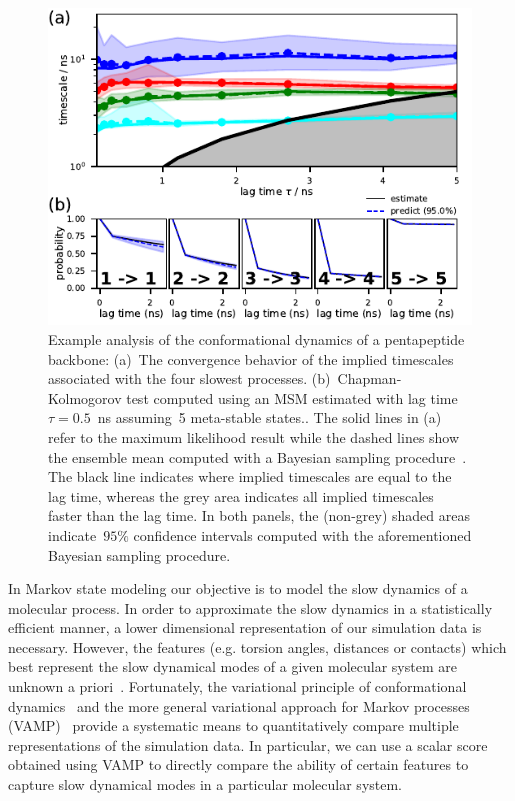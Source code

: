 \documentclass[9pt,tutorial]{livecoms}
\begin{document}
\begin{figure}
\includegraphics{figure_3}
\caption{Example analysis of the conformational dynamics of a pentapeptide backbone:
(a)~The convergence behavior of the implied timescales associated with the four slowest processes.
(b)~Chapman-Kolmogorov test computed using an MSM estimated with lag time $\tau=0.5$~ns assuming~5 meta-stable states..
The solid lines in (a) refer to the maximum likelihood result while the dashed lines show the ensemble mean computed with a Bayesian sampling procedure~\cite{ben-rev-msm}.
The black line indicates where implied timescales are equal to the lag time, whereas the grey area indicates all implied timescales faster than the lag time.
In both panels, the (non-grey) shaded areas indicate~$95\%$ confidence intervals computed with the aforementioned Bayesian sampling procedure.}
\label{fig:its-and-ck}
\end{figure}

In Markov state modeling our objective is to model the slow dynamics of a molecular process. In order to approximate the slow dynamics in a statistically efficient manner, a lower dimensional representation of our simulation data is necessary.
However, the features (e.g. torsion angles, distances or contacts) which best represent the slow dynamical modes of a given molecular system are unknown a priori~\cite{NoeClementiReview}.
Fortunately, the variational principle of conformational dynamics~\cite{noe-vac,nueske-vamk} and the more general variational approach for Markov processes (VAMP)~\cite{vamp-preprint} provide a systematic means to quantitatively compare multiple representations of the simulation data.
In particular, we can use a scalar score obtained using VAMP to directly compare the ability of certain features to capture slow dynamical modes in a particular molecular system.
\end{document}
